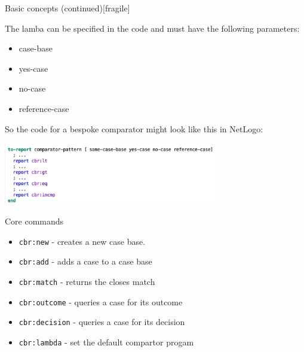 \documentclass[usenames,dvipsnames,10pt]{beamer} %
\begin{document}
\begin{frame}{Basic concepts (continued)}[fragile]

    The lamba can be specified in the code and must have the following
    parameters:

    \begin{itemize}
        \item case-base
        \item yes-case
        \item no-case
        \item reference-case
    \end{itemize}

    So the code for a bespoke comparator might look like this in NetLogo: 

    \includegraphics[width=9.5cm]{img/blank-comparator.png}

\end{frame}

\begin{frame}{Core commands}

    \begin{itemize}
        \item {\color{red}\texttt{cbr:new}} - creates a new case base.
        \item {\color{red}\texttt{cbr:add}} - adds a case to a case base
        \item {\color{red}\texttt{cbr:match}} - returns the closes match
        \item {\color{red}\texttt{cbr:outcome}} - queries a case for its outcome
        \item {\color{red}\texttt{cbr:decision}} - queries a case for its decision
        \item {\color{red}\texttt{cbr:lambda}} - set the default compartor progam
    \end{itemize}

\end{frame}
\end{document}
